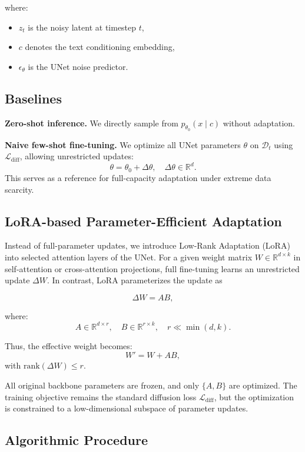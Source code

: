 \documentclass{article}
\begin{document}
where:
\begin{itemize}
\item $z_t$ is the noisy latent at timestep $t$,
\item $c$ denotes the text conditioning embedding,
\item $\epsilon_\theta$ is the UNet noise predictor.
\end{itemize}

\subsection{Baselines}

\textbf{Zero-shot inference.} 
We directly sample from $p_{\theta_0}(x \mid c)$ without adaptation.

\textbf{Naive few-shot fine-tuning.} 
We optimize all UNet parameters $\theta$ on $\mathcal{D}_t$ using $\mathcal{L}_{\text{diff}}$, allowing unrestricted updates:
\[
\theta = \theta_0 + \Delta\theta, \quad 
\Delta\theta \in \mathbb{R}^{d}.
\]
This serves as a reference for full-capacity adaptation under extreme data scarcity.

\subsection{LoRA-based Parameter-Efficient Adaptation}

Instead of full-parameter updates, we introduce Low-Rank Adaptation (LoRA) into selected attention layers of the UNet. 
For a given weight matrix $W \in \mathbb{R}^{d \times k}$ in self-attention or cross-attention projections, full fine-tuning learns an unrestricted update $\Delta W$. 
In contrast, LoRA parameterizes the update as

\begin{equation}
\Delta W = A B,
\end{equation}

where:
\[
A \in \mathbb{R}^{d \times r}, \quad
B \in \mathbb{R}^{r \times k}, \quad
r \ll \min(d,k).
\]

Thus, the effective weight becomes:
\[
W' = W + A B,
\]
with $\text{rank}(\Delta W) \le r$.

All original backbone parameters are frozen, and only $\{A,B\}$ are optimized. 
The training objective remains the standard diffusion loss $\mathcal{L}_{\text{diff}}$, but the optimization is constrained to a low-dimensional subspace of parameter updates.

\subsection{Algorithmic Procedure}
\end{document}
